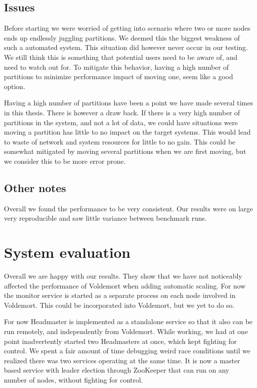 \subsection{Issues}

Before starting we were worried of getting into scenario where two or more nodes ends up endlessly juggling partitions. We deemed this the biggest weakness of such a automated system. This situation did however never occur in our testing. We still think this is something that potential users need to be aware of, and need to watch out for. To mitigate this behavior, having a high number of partitions to minimize performance impact of moving one, seem like a good option.

Having a high number of partitions have been a point we have made several times in this thesis. There is however a draw back. If there is a very high number of partitions in the system, and not a lot of data, we could have situations were moving a partition has little to no impact on the target systems. This would lead to waste of network and system resources for little to no gain. This could be somewhat mitigated by moving several partitions when we are first moving, but we consider this to be more error prone. 


\subsection{Other notes}
Overall we found the performance to be very consistent. Our results were on large very reproducible and saw little variance between benchmark runs.


\section{System evaluation}
\label{eval:discussion}
Overall we are happy with our results. They show that we have not noticeably affected the performance of Voldemort when adding automatic scaling. For now the monitor service is started as a separate process on each node involved in Voldemort. This could be incorporated into Voldemort, but we yet to do so.  

For now Headmaster is implemented as a standalone service so that it also can be run remotely, and independently from Voldemort.
While working, we had at one point inadvertently started two Headmasters at once, which kept fighting for control.
We spent a fair amount of time debugging weird race conditions until we realized there was two services operating at the same time.
It is now a master based service with leader election through ZooKeeper that can run on any number of nodes, without fighting for control.

